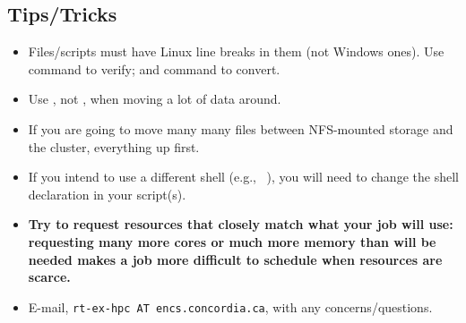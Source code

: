 \subsection{Tips/Tricks}
\label{sect:tips}

\begin{itemize}
\item
Files/scripts must have Linux line breaks in them (not Windows ones).
Use  command to verify; and  command
to convert.

\item
Use , not , when moving a lot of data around.

\item
If you are going to move many many files between NFS-mounted storage and the 
cluster,  everything up first. 

\item
If you intend to use a different shell (e.g., ~\cite{aosa-book-vol1-bash}),
you will need to change the shell declaration in your script(s).


\item
\textbf{Try to request resources that closely match what your job will use: 
requesting many more cores or much more memory than will be needed makes a 
job more difficult to schedule when resources are scarce.}

\item
E-mail, \texttt{rt-ex-hpc AT encs.concordia.ca}, with any concerns/questions.
\end{itemize}

